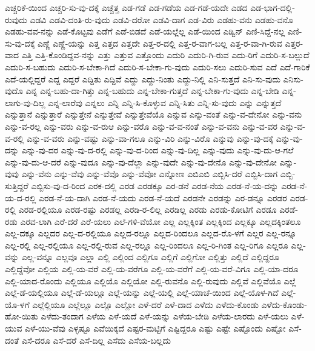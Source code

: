 {ಎಚ್ಚರಿಕೆ-ಯಿಂದ
ಎಚ್ಚರಿ-ಸು-ವು-ದಕ್ಕೆ
ಎಚ್ಚೆತ್ತ
ಎಡ-ಗಡೆ
ಎಡ-ಗಡೆಯ
ಎಡ-ಗಡೆ-ಯದೇ
ಎಡದ
ಎಡ-ಭಾಗ-ದಲ್ಲಿ-ರುವುದು
ಎಡವಿ
ಎಡವಿ-ದಂತಿ-ರು-ವುದು
ಎಡವಿ-ದರೋ
ಎಡವಿ-ದಾಗ
ಎಡ-ವಿರು
ಎಡಹು-ವನು
ಎಡಹು-ವನೊ
ಎಡಹು-ವವ-ನನ್ನು
ಎಡೆ-ಕೊಟ್ಟವು
ಎಡೆಗೆ
ಎಡೆ-ಬಿಡದೆ
ಎಡೆ-ಯಲ್ಲೆಲ್ಲ
ಎಡೆ-ಯಿಂದ
ಎಡ್ವಿನ್
ಎಣಿ-ಸಿದ್ದೆ-ನಲ್ಲ
ಎಣಿ-ಸು-ವು-ದಕ್ಕೆ
ಎಣ್ಣೆ
ಎಣ್ಣೆ-ಯನ್ನು
ಎತ್ತ
ಎತ್ತದ
ಎತ್ತದೇ
ಎತ್ತ-ರ-ದಲ್ಲಿ
ಎತ್ತ-ರ-ವಾಗ-ಬಲ್ಲ
ಎತ್ತ-ರ-ವಾ-ಗಿ-ರುವ
ಎತ್ತರ-ವಾದ
ಎತ್ತಿ
ಎತ್ತಿ-ಕೊಂಡಿದ್ದವ-ನನ್ನು
ಎತ್ತು
ಎತ್ತುವ
ಎತ್ತೊಂದು
ಎದುರಿ
ಎದುರಿ-ಗಿ-ರುವ
ಎದು-ರಿಗೆ
ಎದುರಿ-ಸ-ಬಲ್ಲುದೆ
ಎದುರಿ-ಸ-ಬಹುದು
ಎದುರಿ-ಸ-ಬೇಕಾ-ಗಿದೆ
ಎದುರಿ-ಸ-ಬೇಕಾ-ಗು-ವುದು
ಎದುರಿ-ಸಲು
ಎದುರಿ-ಸುವ
ಎದೆ
ಎದೆ-ಗಾರಿಕೆ
ಎದೆ-ಯಲ್ಲಿದ್ದರೆ
ಎದ್ದ
ಎದ್ದರೆ
ಎದ್ದಿತು
ಎದ್ದಿವೆ
ಎದ್ದು
ಎದ್ದು-ನಿಂತು
ಎದ್ದು-ನಿಲ್ಲಿ
ಎನಿ-ಸುತ್ತದೆ
ಎನಿ-ಸು-ವುದು
ಎನಿಸು-ವುದೊ
ಎನ್ನ
ಎನ್ನ-ಬಹು-ದಾ-ಗಿತ್ತು
ಎನ್ನ-ಬಹುದು
ಎನ್ನ-ಬೇಕಾ-ಗುತ್ತದೆ
ಎನ್ನ-ಬೇಕಾ-ಗು-ವುದು
ಎನ್ನ-ಬೇಡಿ
ಎನ್ನ-ಲಾಗು-ವು-ದಿಲ್ಲ
ಎನ್ನ-ಲಾರೆವು
ಎನ್ನಲು
ಎನ್ನಿ
ಎನ್ನಿ-ಸಿ-ಕೊಳ್ಳುವ
ಎನ್ನಿ-ಸಿತು
ಎನ್ನಿ-ಸು-ವುದು
ಎನ್ನು
ಎನ್ನುತ್ತದೆ
ಎನ್ನುತ್ತಾನೆ
ಎನ್ನುತ್ತಾರೆ
ಎನ್ನುತ್ತೇನೆ
ಎನ್ನುತ್ತೇವೆ
ಎನ್ನುತ್ತೇವೆಯೊ
ಎನ್ನುವ
ಎನ್ನು-ವಂತೆ
ಎನ್ನು-ವ-ದೇನೋ
ಎನ್ನು-ವನು
ಎನ್ನು-ವ-ರಲ್ಲ
ಎನ್ನು-ವರು
ಎನ್ನು-ವ-ರುಆ
ಎನ್ನು-ವರೊ
ಎನ್ನು-ವ-ವ-ನಂತೆ
ಎನ್ನು-ವ-ವನು
ಎನ್ನು-ವ-ವರ
ಎನ್ನು-ವ-ವ-ರಲ್ಲಿ
ಎನ್ನು-ವ-ವರು
ಎನ್ನು-ವಷ್ಟು
ಎನ್ನು-ವಾ-ಗಲೂ
ಎನ್ನು-ವಿರಿ
ಎನ್ನು-ವಿರೊ
ಎನ್ನುವು
ಎನ್ನು-ವು-ದಕ್ಕೆ
ಎನ್ನು-ವು-ದನ್ನು
ಎನ್ನು-ವು-ದರ
ಎನ್ನು-ವು-ದ-ರಲ್ಲಿ
ಎನ್ನು-ವು-ದ-ರಿಂದ
ಎನ್ನು-ವು-ದಿಲ್ಲ
ಎನ್ನು-ವುದು
ಎನ್ನು-ವು-ದು-ಆ-ಗಲೆ
ಎನ್ನು-ವು-ದು-ಆ-ದರೆ
ಎನ್ನು-ವುದೂ
ಎನ್ನು-ವು-ದೆಲ್ಲಾ
ಎನ್ನು-ವುದೇ
ಎನ್ನು-ವು-ದೇನೊ
ಎನ್ನು-ವು-ದೇನೋ
ಎನ್ನು-ವುವು
ಎನ್ನು-ವೆನು
ಎನ್ನು-ವೆವು
ಎನ್ನು-ವೆವೊ
ಎನ್ನು-ವೆವೋ
ಎನ್ನೋಣ
ಎಬಿಎಬಿ
ಎಬ್ಬಿಸಿ-ದರೆ
ಎಬ್ಬಿಸಿ-ದಾಗ
ಎಬ್ಬಿ-ಸುತ್ತಿದ್ದರೆ
ಎಬ್ಬಿಸು-ವು-ದ-ರಿಂದ
ಎರಕ-ದಲ್ಲಿ
ಎರಡ
ಎರಡಕ್ಕೂ
ಎರ-ಡನೆ
ಎರಡ-ನೆಯ
ಎರಡ-ನೆ-ಯ-ದನ್ನು
ಎರಡ-ನೆ-ಯ-ದ-ರಲ್ಲಿ
ಎರಡ-ನೆ-ಯ-ದಾಗಿ
ಎರಡ-ನೆ-ಯದು
ಎರಡ-ನೆ-ಯದೆ
ಎರಡನೇ
ಎರಡನ್ನು
ಎರ-ಡನ್ನೂ
ಎರಡರ
ಎರಡ-ರಲ್ಲಿ
ಎರಡ-ರಲ್ಲಿಯೂ
ಎರಡ-ರಷ್ಟು
ಎರಡಲ್ಲ
ಎರಡಿ-ರ-ಲಿಲ್ಲ
ಎರಡಿಲ್ಲ
ಎರಡು
ಎರಡು-ಕೋಟಿಗೆ
ಎರಡೂ
ಎರಡೆ-ರಡು
ಎರವ-ಲಾಗಿ
ಎರೆ-ದರೆ
ಎರೆ-ಯಲು
ಎಲೆ-ಗಳಿ-ವೆಯೋ
ಎಲ್ಲ
ಎಲ್ಲಕ್ಕಿಂತ
ಎಲ್ಲಕ್ಕಿಂದ
ಎಲ್ಲಕ್ಕೂ
ಎಲ್ಲದಕ್ಕಿಂತಲೂ
ಎಲ್ಲ-ದಕ್ಕೂ
ಎಲ್ಲದರ
ಎಲ್ಲ-ದ-ರಲ್ಲಿಯೂ
ಎಲ್ಲದ-ರಲ್ಲೂ
ಎಲ್ಲದ-ರಿಂದಲೂ
ಎಲ್ಲದ-ರೊ-ಳಗೆ
ಎಲ್ಲರ
ಎಲ್ಲ-ರನ್ನೂ
ಎಲ್ಲ-ರಲ್ಲಿ
ಎಲ್ಲ-ರಲ್ಲಿಯೂ
ಎಲ್ಲ-ರಲ್ಲಿ-ರುವ
ಎಲ್ಲ-ರಲ್ಲೂ
ಎಲ್ಲ-ರಿಂದಲೂ
ಎಲ್ಲ-ರಿ-ಗಿಂತ
ಎಲ್ಲ-ರಿಗೂ
ಎಲ್ಲರೂ
ಎಲ್ಲ-ವನ್ನು
ಎಲ್ಲ-ವನ್ನೂ
ಎಲ್ಲವೂ
ಎಲ್ಲಾ
ಎಲ್ಲಿ
ಎಲ್ಲಿಂದ
ಎಲ್ಲಿಗೂ
ಎಲ್ಲಿಗೆ
ಎಲ್ಲಿಗೋ
ಎಲ್ಲಿತ್ತು
ಎಲ್ಲಿದೆ
ಎಲ್ಲಿದ್ದರೂ
ಎಲ್ಲಿದ್ದೆವೋ
ಎಲ್ಲಿಯ
ಎಲ್ಲಿ-ಯ-ವರೆ
ಎಲ್ಲಿ-ಯ-ವರೆಗೂ
ಎಲ್ಲಿ-ಯ-ವರೆಗೆ
ಎಲ್ಲಿ-ಯ-ವರೆ-ವಿಗೂ
ಎಲ್ಲಿ-ಯಾ-ದರೂ
ಎಲ್ಲಿ-ಯಾದ-ರೊಂದು
ಎಲ್ಲಿಯೂ
ಎಲ್ಲಿಯೊ
ಎಲ್ಲಿಯೋ
ಎಲ್ಲಿ-ರುವನೊ
ಎಲ್ಲಿ-ರುವುದು
ಎಲ್ಲಿವೆ
ಎಲ್ಲಿವೆಯೊ
ಎಲ್ಲೆ
ಎಲ್ಲೆ-ಡೆ-ಯಲ್ಲಿಯೂ
ಎಲ್ಲೆ-ಡೆ-ಯಲ್ಲೂ
ಎಲ್ಲೆ-ಯನ್ನು
ಎಲ್ಲೆ-ಯಲ್ಲಿ
ಎಲ್ಲೆ-ಯಾಚೆ-ಯಿಂದ
ಎಲ್ಲೆ-ಯೊಳ-ಗಿದೆ
ಎಲ್ಲೆ-ಯೊ-ಳಗೆ
ಎಲ್ಲೆಲ್ಲಿಯೂ
ಎಲ್ಲೆಲ್ಲೂ
ಎಲ್ಲೊ
ಎಲ್ಲೋ
ಎಳೆ-ದರೆ
ಎಳೆ-ದಾದ
ಎಳೆದು
ಎಳೆದು-ಕೊಂಡು
ಎಳೆದು-ಕೊಂಡು-ಹೋ-ಯಿತು
ಎಳೆದು-ತಂದಾಗ
ಎಳೆಯ
ಎಳೆ-ಯದೆ
ಎಳೆ-ಯನ್ನು
ಎಳೆಯ-ಬೇಡಿ
ಎಳೆಯ-ಲಾರದು
ಎಳೆ-ಯಲು
ಎಳೆ-ಯುವ
ಎಳೆ-ಯು-ವೆವು
ಎಳ್ಳಷ್ಟೂ
ಎವೆಯಿಕ್ಕದೆ
ಎಷ್ಟರ-ಮಟ್ಟಿಗೆ
ಎಷ್ಟಿದ್ದರೂ
ಎಷ್ಟು
ಎಷ್ಟೇ
ಎಷ್ಟೊಂದು
ಎಷ್ಟೋ
ಎಸೆ-ದಂತೆ
ಎಸೆ-ದರೂ
ಎಸೆ-ದರೆ
ಎಸೆ-ದಿಲ್ಲ
ಎಸೆದು
ಎಸೆಯ-ಬಲ್ಲದು
}
